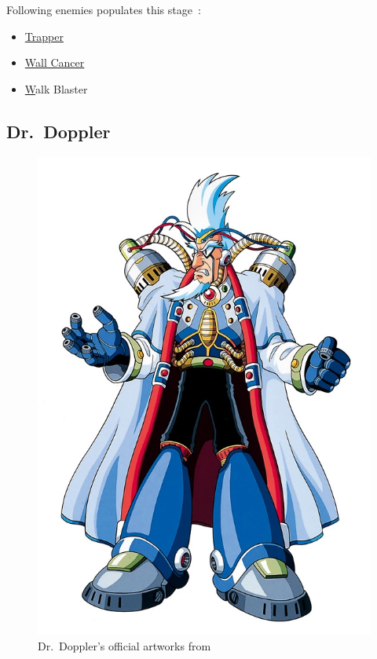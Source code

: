Following enemies populates this stage~\cite{wiki:Doppler_stage}:
\begin{itemize}
	\item \hyperlink{enem:Trapper}{Trapper}
	\item \hyperlink{enem:Wall_Cancer}{Wall Cancer}
	\item \hyperlink{enem:Walk_Blaster}Walk Blaster{}
\end{itemize}

\subsection{Dr.~Doppler}\label{boss:Doppler} 
\begin{figure}[htp]
	\centering
	\includegraphics[height=\portraitsize]{figures/X3/Doppler_stages/drdoppler.png}
	\caption{Dr.~Doppler's official artworks from~\cite{book:MMX_Complete_art}}
\end{figure}

